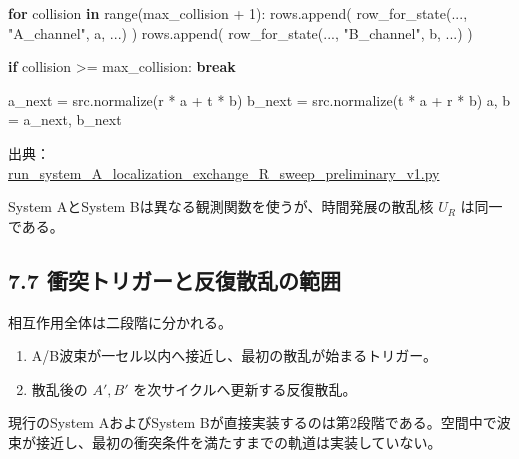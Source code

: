 \documentclass[
  10pt,
  a4paper,
]{article}
\newenvironment{Shaded}{}{}
\newcommand{\BuiltInTok}[1]{\textcolor[rgb]{0.00,0.50,0.00}{#1}}
\newcommand{\ControlFlowTok}[1]{\textcolor[rgb]{0.00,0.44,0.13}{\textbf{#1}}}
\newcommand{\DecValTok}[1]{\textcolor[rgb]{0.25,0.63,0.44}{#1}}
\newcommand{\KeywordTok}[1]{\textcolor[rgb]{0.00,0.44,0.13}{\textbf{#1}}}
\newcommand{\NormalTok}[1]{#1}
\newcommand{\OperatorTok}[1]{\textcolor[rgb]{0.40,0.40,0.40}{#1}}
\newcommand{\StringTok}[1]{\textcolor[rgb]{0.25,0.44,0.63}{#1}}
\providecommand{\tightlist}{%
  \setlength{\itemsep}{0pt}\setlength{\parskip}{0pt}}
\begin{document}
\begin{Shaded}
\begin{Highlighting}[]
\ControlFlowTok{for}\NormalTok{ collision }\KeywordTok{in} \BuiltInTok{range}\NormalTok{(max\_collision }\OperatorTok{+} \DecValTok{1}\NormalTok{):}
\NormalTok{    rows.append(}
\NormalTok{        row\_for\_state(..., }\StringTok{"A\_channel"}\NormalTok{, a, ...)}
\NormalTok{    )}
\NormalTok{    rows.append(}
\NormalTok{        row\_for\_state(..., }\StringTok{"B\_channel"}\NormalTok{, b, ...)}
\NormalTok{    )}

    \ControlFlowTok{if}\NormalTok{ collision }\OperatorTok{\textgreater{}=}\NormalTok{ max\_collision:}
        \ControlFlowTok{break}

\NormalTok{    a\_next }\OperatorTok{=}\NormalTok{ src.normalize(r }\OperatorTok{*}\NormalTok{ a }\OperatorTok{+}\NormalTok{ t }\OperatorTok{*}\NormalTok{ b)}
\NormalTok{    b\_next }\OperatorTok{=}\NormalTok{ src.normalize(t }\OperatorTok{*}\NormalTok{ a }\OperatorTok{+}\NormalTok{ r }\OperatorTok{*}\NormalTok{ b)}
\NormalTok{    a, b }\OperatorTok{=}\NormalTok{ a\_next, b\_next}
\end{Highlighting}
\end{Shaded}

出典：\\
\href{../20260715/run_system_A_localization_exchange_R_sweep_preliminary_v1.py\#L718-L737}{run\_system\_A\_localization\_exchange\_R\_sweep\_preliminary\_v1.py}

System AとSystem Bは異なる観測関数を使うが、時間発展の散乱核 \(U_R\)
は同一である。

\subsection{7.7
衝突トリガーと反復散乱の範囲}\label{ux885dux7a81ux30c8ux30eaux30acux30fcux3068ux53cdux5fa9ux6563ux4e71ux306eux7bc4ux56f2}

相互作用全体は二段階に分かれる。

\begin{enumerate}
\def\labelenumi{\arabic{enumi}.}
\tightlist
\item
  A/B波束が一セル以内へ接近し、最初の散乱が始まるトリガー。
\item
  散乱後の \(A',B'\) を次サイクルへ更新する反復散乱。
\end{enumerate}

現行のSystem AおよびSystem
Bが直接実装するのは第2段階である。空間中で波束が接近し、最初の衝突条件を満たすまでの軌道は実装していない。
\end{document}
